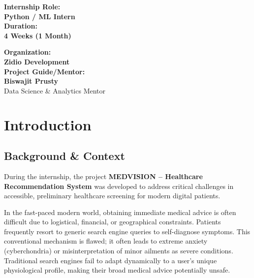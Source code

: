 \documentclass[12pt,a4paper]{report}
\begin{document}
\begin{titlepage}
    \begin{minipage}{0.45\textwidth}
        \begin{center}
            \textcolor{zidiotextgray}{\textbf{Internship Role:}}\\
            \textbf{Python / ML Intern}\\[0.8cm]
            \textcolor{zidiotextgray}{\textbf{Duration:}}\\
            \textbf{4 Weeks (1 Month)}
        \end{center}
    \end{minipage}
    \hfill
    \begin{minipage}{0.45\textwidth}
        \begin{center}
            \textcolor{zidiotextgray}{\textbf{Organization:}}\\
            \textbf{Zidio Development}\\[0.8cm]
            \textcolor{zidiotextgray}{\textbf{Project Guide/Mentor:}}\\
            \textbf{Biswajit Prusty}\\
            \small Data Science \& Analytics Mentor
        \end{center}
    \end{minipage}
    
    \vspace{1cm}
\end{titlepage}

\tableofcontents
\pagebreak
\listoffigures
\pagebreak
\listoftables
\pagebreak

\chapter{Introduction}

\section{Background \& Context}
During the internship, the project \textbf{MEDVISION – Healthcare Recommendation System} was developed to address critical challenges in accessible, preliminary healthcare screening for modern digital patients.

In the fast-paced modern world, obtaining immediate medical advice is often difficult due to logistical, financial, or geographical constraints. Patients frequently resort to generic search engine queries to self-diagnose symptoms. This conventional mechanism is flawed; it often leads to extreme anxiety (cyberchondria) or misinterpretation of minor ailments as severe conditions. Traditional search engines fail to adapt dynamically to a user's unique physiological profile, making their broad medical advice potentially unsafe.
\end{document}
